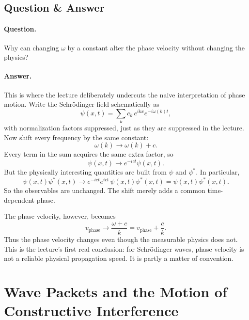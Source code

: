 \subsection{Question \& Answer}

\paragraph{Question.} Why can changing \(\omega\) by a constant alter the phase velocity without changing the physics?

\paragraph{Answer.} This is where the lecture deliberately undercuts the naive interpretation of phase motion. Write the Schr\"odinger field schematically as
\begin{equation}
\psi(x,t)=\sum_k c_k\,e^{ikx}e^{-i\omega(k)t},
\end{equation}
with normalization factors suppressed, just as they are suppressed in the lecture. Now shift every frequency by the same constant:
\begin{equation}
\omega(k)\longrightarrow \omega(k)+c.
\end{equation}
Every term in the sum acquires the same extra factor, so
\begin{equation}
\psi(x,t)\longrightarrow e^{-ict}\psi(x,t).
\end{equation}
But the physically interesting quantities are built from \(\psi\) and \(\psi^\ast\). In particular,
\begin{equation}
\psi(x,t)\psi^\ast(x,t)\longrightarrow
e^{-ict}e^{ict}\,\psi(x,t)\psi^\ast(x,t)
=
\psi(x,t)\psi^\ast(x,t).
\end{equation}
So the observables are unchanged. The shift merely adds a common time-dependent phase.

The phase velocity, however, becomes
\begin{equation}
v_{\mathrm{phase}}\longrightarrow \frac{\omega+c}{k}
=
v_{\mathrm{phase}}+\frac{c}{k}.
\end{equation}
Thus the phase velocity changes even though the measurable physics does not. This is the lecture's first real conclusion: for Schr\"odinger waves, phase velocity is not a reliable physical propagation speed. It is partly a matter of convention.

\section{Wave Packets and the Motion of Constructive Interference}

